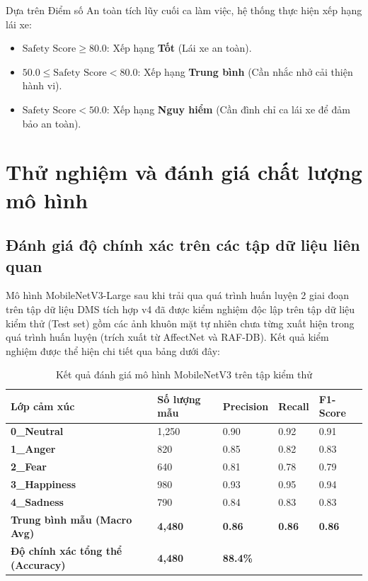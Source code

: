 \documentclass[../DoAn.tex]{subfiles}
\begin{document}
Dựa trên Điểm số An toàn tích lũy cuối ca làm việc, hệ thống thực hiện xếp hạng lái xe:
\begin{itemize}
    \item $\text{Safety Score} \ge 80.0$: Xếp hạng \textbf{Tốt} (Lái xe an toàn).
    \item $50.0 \le \text{Safety Score} < 80.0$: Xếp hạng \textbf{Trung bình} (Cần nhắc nhở cải thiện hành vi).
    \item $\text{Safety Score} < 50.0$: Xếp hạng \textbf{Nguy hiểm} (Cần đình chỉ ca lái xe để đảm bảo an toàn).
\end{itemize}

\section{Thử nghiệm và đánh giá chất lượng mô hình}
\label{section:5.3}

\subsection{Đánh giá độ chính xác trên các tập dữ liệu liên quan}
Mô hình MobileNetV3-Large sau khi trải qua quá trình huấn luyện 2 giai đoạn trên tập dữ liệu DMS tích hợp v4 đã được kiểm nghiệm độc lập trên tập dữ liệu kiểm thử (Test set) gồm các ảnh khuôn mặt tự nhiên chưa từng xuất hiện trong quá trình huấn luyện (trích xuất từ AffectNet và RAF-DB). Kết quả kiểm nghiệm được thể hiện chi tiết qua bảng dưới đây:

\begin{table}[htbp]
\centering
\caption{Kết quả đánh giá mô hình MobileNetV3 trên tập kiểm thử}
\label{tab:metrics}
\begin{tabular}{|l|l|l|l|l|}
\hline
\textbf{Lớp cảm xúc} & \textbf{Số lượng mẫu} & \textbf{Precision} & \textbf{Recall} & \textbf{F1-Score} \\ \hline
\textbf{0\_Neutral} & 1,250 & 0.90 & 0.92 & 0.91 \\ \hline
\textbf{1\_Anger} & 820 & 0.85 & 0.82 & 0.83 \\ \hline
\textbf{2\_Fear} & 640 & 0.81 & 0.78 & 0.79 \\ \hline
\textbf{3\_Happiness} & 980 & 0.93 & 0.95 & 0.94 \\ \hline
\textbf{4\_Sadness} & 790 & 0.84 & 0.83 & 0.83 \\ \hline
\textbf{Trung bình mẫu (Macro Avg)} & \textbf{4,480} & \textbf{0.86} & \textbf{0.86} & \textbf{0.86} \\ \hline
\textbf{Độ chính xác tổng thể (Accuracy)} & \textbf{4,480} & \multicolumn{3}{l|}{\textbf{88.4\%}} \\ \hline
\end{tabular}
\end{table}
\end{document}
